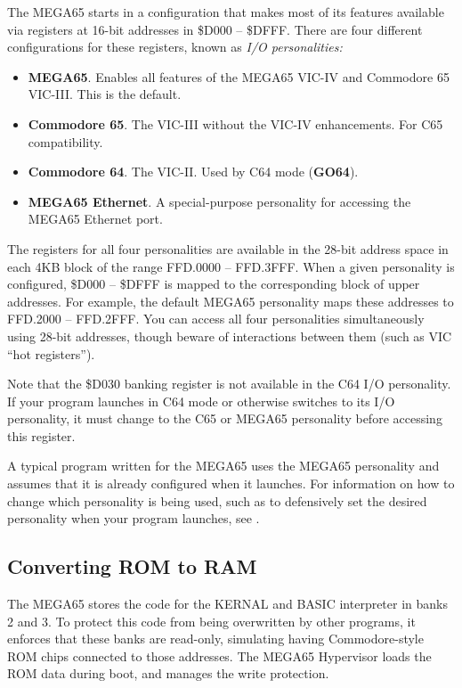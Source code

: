 The MEGA65 starts in a configuration that makes most of its features available via registers at 16-bit addresses in \$D000 -- \$DFFF. There are four different configurations for these registers, known as {\em I/O personalities:}

\begin{itemize}
\item {\bf MEGA65}. Enables all features of the MEGA65 VIC-IV and Commodore 65 VIC-III. This is the default.
\item {\bf Commodore 65}. The VIC-III without the VIC-IV enhancements. For C65 compatibility.
\item {\bf Commodore 64}. The VIC-II. Used by C64 mode (\textbf{GO64}).
\item {\bf MEGA65 Ethernet}. A special-purpose personality for accessing the MEGA65 Ethernet port.
\end{itemize}

The registers for all four personalities are available in the 28-bit address space in each 4KB block of the range FFD.0000 -- FFD.3FFF. When a given personality is configured, \$D000 -- \$DFFF is mapped to the corresponding block of upper addresses. For example, the default MEGA65 personality maps these addresses to FFD.2000 -- FFD.2FFF. You can access all four personalities simultaneously using 28-bit addresses, though beware of interactions between them (such as VIC ``hot registers'').

Note that the \$D030 banking register is not available in the C64 I/O personality. If your program launches in C64 mode or otherwise switches to its I/O personality, it must change to the C65 or MEGA65 personality before accessing this register.

A typical program written for the MEGA65 uses the MEGA65 personality and assumes that it is already configured when it launches. For information on how to change which personality is being used, such as to defensively set the desired personality when your program launches, see .

\subsection{Converting ROM to RAM}

The MEGA65 stores the code for the KERNAL and BASIC interpreter in banks 2 and 3. To protect this code from being overwritten by other programs, it enforces that these banks are read-only, simulating having Commodore-style ROM chips connected to those addresses. The MEGA65 Hypervisor loads the ROM data during boot, and manages the write protection.


